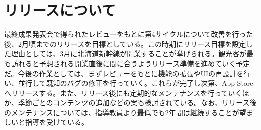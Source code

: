 \section{リリースについて}
最終成果発表会で得られたレビューをもとに第4サイクルについて改善を行った後、2月頃までのリリースを目標としている。この時期にリリース目標を設定した理由としては、3月に北海道新幹線が開業することが挙げられる。観光客が最も訪れると予想される開業直後に間に合うようリリース準備を進めていく予定だ。今後の作業としては、まずレビューをもとに機能の拡張やUIの再設計を行い、並行して既知のバグの修正を行っていく。これらが完了し次第、App Storeへリリースする。また、リリース後にも定期的なメンテナンスを行っていくほか、季節ごとのコンテンツの追加などの案も検討されている。なお、リリース後のメンテナンスについては、指導教員より最低でも2年間は継続することが望ましいと指導を受けている。
